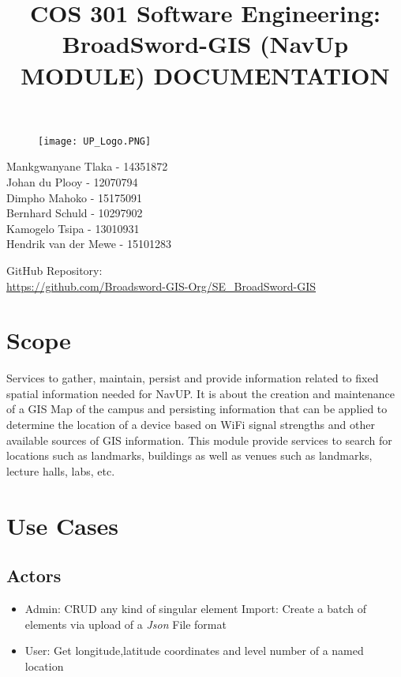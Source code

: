 \documentclass{article}
\begin{document}
		\begin{figure}[t]
			\centering
			\texttt{[image: UP\_Logo.PNG]}
		\end{figure}
	
			\title{COS 301 Software Engineering: BroadSword-GIS (NavUp MODULE) DOCUMENTATION}
\maketitle
				
		\begin{flushright} \large
			Mankgwanyane Tlaka    - 14351872\\
			Johan	     du Plooy -	12070794\\
			Dimpho	     Mahoko   -	15175091\\
			Bernhard	 Schuld	  - 10297902\\
			Kamogelo	 Tsipa	  - 13010931\\
			Hendrik	van  der Mewe - 15101283\\
		\end{flushright}
		
		
		
		
		GitHub Repository: \href{https://github.com/Broadsword-GIS-Org/SE_BroadSword-GIS}\\
		\url{https://github.com/Broadsword-GIS-Org/SE_BroadSword-GIS}
	

\clearpage
\tableofcontents
\clearpage

\section{Scope}
Services to gather, maintain, persist and provide information related to fixed
spatial information needed for NavUP. It is about the creation and maintenance
 of a GIS Map of the campus and persisting information that can be
applied to determine the location of a device based on WiFi signal strengths
and other available sources of GIS information.
This module provide services to search for locations such as landmarks,
buildings as well as venues such as landmarks, lecture halls, labs, etc.

\section{Use Cases}
	\subsection{Actors}
		\begin{itemize}
 			\item Admin: CRUD any kind of singular element Import: Create a batch of elements via upload of a \textit{Json} File       format
  			\item User: Get longitude,latitude coordinates and level number of a named location
		\end{itemize}
		
\end{document}
